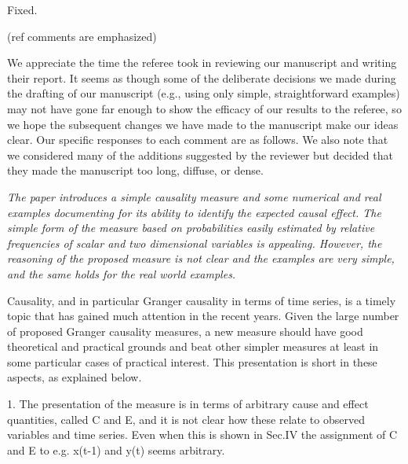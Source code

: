 \documentclass[a4paper,11pt]{article}
\begin{document}
Fixed.

\newpage{}

\noindent \hrulefill

\noindent (ref comments are emphasized)
\vspace{0.5cm}

We appreciate the time the referee took in reviewing our manuscript and writing their report.  It seems as though some of the deliberate decisions we made during the drafting of our manuscript (e.g., using only simple, straightforward examples) may not have gone far enough to show the efficacy of our results to the referee, so we hope the subsequent changes we have made to the manuscript make our ideas clear.  Our specific responses to each comment are as follows.  We also note that we considered many of the additions suggested by the reviewer but decided that they made the manuscript too long, diffuse, or dense. 

\vspace{0.5cm}

{\em The paper introduces a simple causality measure and some numerical and
real examples documenting for its ability to identify the expected
causal effect. The simple form of the measure based on probabilities
easily estimated by relative frequencies of scalar and two dimensional
variables is appealing. However, the reasoning of the proposed measure
is not clear and the examples are very simple, and the same holds for
the real world examples.

Causality, and in particular Granger causality in terms of time
series, is a timely topic that has gained much attention in the recent
years. Given the large number of proposed Granger causality measures,
a new measure should have good theoretical and practical grounds and
beat other simpler measures at least in some particular cases of
practical interest. This presentation is short in these aspects, as
explained below.

1. The presentation of the measure is in terms of arbitrary cause and
effect quantities, called C and E, and it is not clear how these
relate to observed variables and time series. Even when this is shown
in Sec.IV the assignment of C and E to e.g. x(t-1) and y(t) seems
arbitrary.}
\vspace{0.5cm}
\end{document}
